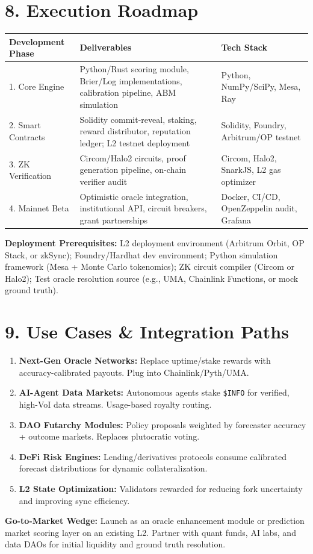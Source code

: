 \documentclass[11pt,a4paper]{article}
\begin{document}
\section*{8. Execution Roadmap}
\begin{center}
\begin{tabularx}{\textwidth}{@{}lXX@{}}
\toprule
\textbf{Development Phase} & \textbf{Deliverables} & \textbf{Tech Stack} \\
\midrule
1. Core Engine & Python/Rust scoring module, Brier/Log implementations, calibration pipeline, ABM simulation & Python, NumPy/SciPy, Mesa, Ray \\
2. Smart Contracts & Solidity commit-reveal, staking, reward distributor, reputation ledger; L2 testnet deployment & Solidity, Foundry, Arbitrum/OP testnet \\
3. ZK Verification & Circom/Halo2 circuits, proof generation pipeline, on-chain verifier audit & Circom, Halo2, SnarkJS, L2 gas optimizer \\
4. Mainnet Beta & Optimistic oracle integration, institutional API, circuit breakers, grant partnerships & Docker, CI/CD, OpenZeppelin audit, Grafana \\
\bottomrule
\end{tabularx}
\end{center}
\noindent \textbf{Deployment Prerequisites:} L2 deployment environment (Arbitrum Orbit, OP Stack, or zkSync); Foundry/Hardhat dev environment; Python simulation framework (Mesa + Monte Carlo tokenomics); ZK circuit compiler (Circom or Halo2); Test oracle resolution source (e.g., UMA, Chainlink Functions, or mock ground truth).

\section*{9. Use Cases \& Integration Paths}
\begin{enumerate}[leftmargin=*]
    \item \textbf{Next-Gen Oracle Networks:} Replace uptime/stake rewards with accuracy-calibrated payouts. Plug into Chainlink/Pyth/UMA.
    \item \textbf{AI-Agent Data Markets:} Autonomous agents stake \texttt{\$INFO} for verified, high-VoI data streams. Usage-based royalty routing.
    \item \textbf{DAO Futarchy Modules:} Policy proposals weighted by forecaster accuracy + outcome markets. Replaces plutocratic voting.
    \item \textbf{DeFi Risk Engines:} Lending/derivatives protocols consume calibrated forecast distributions for dynamic collateralization.
    \item \textbf{L2 State Optimization:} Validators rewarded for reducing fork uncertainty and improving sync efficiency.
\end{enumerate}
\noindent \textbf{Go-to-Market Wedge:} Launch as an oracle enhancement module or prediction market scoring layer on an existing L2. Partner with quant funds, AI labs, and data DAOs for initial liquidity and ground truth resolution.
\end{document}
